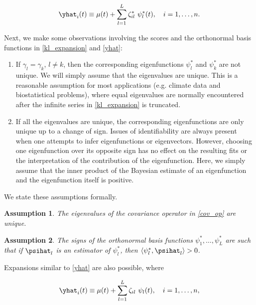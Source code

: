 \documentclass[12pt]{article}
\theoremstyle{plain}
\newtheorem{assumption}{Assumption}
\theoremstyle{definition}
\theoremstyle{remark}
\begin{document}
\begin{equation}
	\yhat_i (t) \equiv \mu (t) + \sum_{l=1}^L \zeta^*_{il} \ \psi^*_l (t), \quad i = 1, \dots, n.
\label{yhat}
\end{equation}

Next, we make some observations involving the scores and the orthonormal basis functions in \eqref{kl_expansion}
and \eqref{yhat}:

\begin{enumerate}
	\item If $\gamma_l = \gamma_k$, $l \neq k$, then the corresponding eigenfunctions $\psi^*_l$ and $\psi^*_k$
	are not unique. We will simply assume that the eigenvalues are unique. This is a reasonable assumption
	for most applications (e.g. climate data
	and biostatistical problems), where equal eigenvalues are normally encountered after the infinite series
	in \eqref{kl_expansion} is truncated.
	\item If all the eigenvalues are unique, the corresponding eigenfunctions are only unique up to
	a change of sign. Issues of identifiability are always present when one attempts to infer eigenfunctions or
	eigenvectors. However, choosing one eigenfunction over its opposite sign has no effect on the resulting fits or
	the interpretation of the contribution of the eigenfunction.
	Here, we simply assume that the inner product of the Bayesian estimate of an
	eigenfunction and the eigenfunction itself is positive.
\end{enumerate}

\noindent We state these assumptions formally.

\begin{assumption}
	
	The eigenvalues of the covariance operator in \eqref{cov_op} are unique.
	
\label{asspn:scores}
\end{assumption}

\begin{assumption}
	
	The signs of the orthonormal basis functions $\psi^*_1, \dots, \psi^*_L$ are such that if $\psihat_l$ is an
	estimator of $\psi^*_l$, then $\langle \psi^*_l , \psihat_l \rangle > 0$.
	
\label{asspn:signs}
\end{assumption}

Expansions similar to \eqref{yhat} are also possible, where

\begin{equation}
	\yhat_i (t) \equiv \mu (t) + \sum_{l=1}^L \zeta_{il} \ \psi_l (t), \quad i = 1, \dots, n,
\label{yhat_not_orthogonal}
\end{equation}
\end{document}
